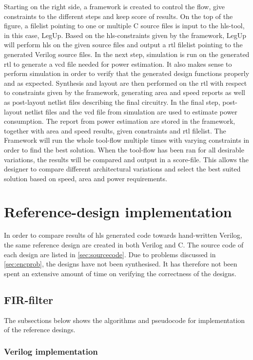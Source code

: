 Starting on the right side, a framework is created to control the flow, give constraints to the different steps and keep score of results. On the top of the figure, a filelist pointing to one or multiple C source files is input to the \gls{hls}-tool, in this case, LegUp. Based on the \gls{hls}-constraints given by the framework, LegUp will perform \gls{hls} on the given source files and output a \gls{rtl} filelist pointing to the generated Verilog source files. In the next step, simulation is run on the generated \gls{rtl} to generate a \gls{vcd} file needed for power estimation. It also makes sense to perform simulation in order to verify that the generated design functions properly and as expected. Synthesis and layout are then performed on the \gls{rtl} with respect to constraints given by the framework, generating area and speed reports as well as post-layout netlist files describing the final circuitry. In the final step, post-layout netlist files and the \gls{vcd} file from simulation are used to estimate power consumption. The report from power estimation are stored in the framework, together with area and speed results, given constraints and \gls{rtl} filelist. The Framework will run the whole tool-flow multiple times with varying constraints in order to find the best solution. When the tool-flow has been ran for all desirable variations, the results will be compared and output in a score-file. This allows the designer to compare different architectural variations and select the best suited solution based on speed, area and power requirements.

\section{Reference-design implementation}
In order to compare results of \gls{hls} generated code towards hand-written Verilog, the same reference design are created in both Verilog and C. The source code of each design are listed in \cref{sec:sourcecode}. Due to problems discussed in \cref{sec:encprob}, the designs have not been synthesised. It has therefore not been spent an extensive amount of time on verifying the correctness of the designs.
\subsection{FIR-filter}

The subsections below shows the algorithms and pseudocode for implementation of the reference desings.

\subsubsection{Verilog implementation}

